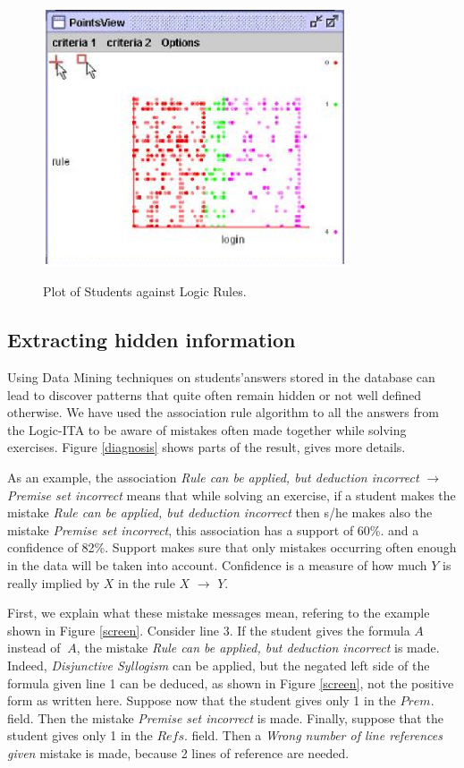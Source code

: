 \begin{figure}[htbp]
{\includegraphics[width=9cm]{login_rule2.eps}}
\caption{Plot of Students against Logic Rules.}
\label{loginRules}
\end{figure}


\subsection{Extracting hidden information}

Using Data Mining techniques on students'answers stored in the database can lead to discover  patterns that quite often remain hidden or not well defined otherwise. We have used the association rule algorithm to all the answers from the Logic-ITA to be aware of mistakes often made together while solving exercises. Figure \ref{diagnosis} shows parts of the result, \cite{AK-AIeD} gives more details. 

As an example, the association
{\em Rule can be applied, but deduction incorrect} $\rightarrow $
{\em Premise set incorrect} means that while solving an exercise, if a student makes the mistake {\em Rule can be applied, but deduction incorrect} then s/he makes also the mistake {\em Premise set incorrect}, this association has a support of 60\%. and a confidence of 82\%.
Support makes sure that only mistakes occurring
often enough in the data will be taken into account. Confidence is a measure of how much  $Y$  is really
implied by $X$ in the rule  $X$ $\rightarrow $ $Y$.  


First, we  explain what these mistake messages mean, refering to the example
shown in Figure \ref{screen}. Consider
line 3. If the student  gives
the formula $A$ instead of $~A$, the mistake 
{\em Rule can be applied, but deduction incorrect}
is made.
Indeed, {\em Disjunctive Syllogism} can be applied, but the negated left side of the formula given line 1 can be deduced, as shown in Figure \ref{screen}, not the positive form as written here.  Suppose now that the student gives only 1
in the $Prem.$ field. Then the mistake {\em Premise set incorrect}
is made.
Finally, suppose that the student  gives only 1 in the $Re\!f\!s.$
field. Then a 
{\em Wrong number of line references given} mistake is
 made, because 2 lines of reference are needed.

